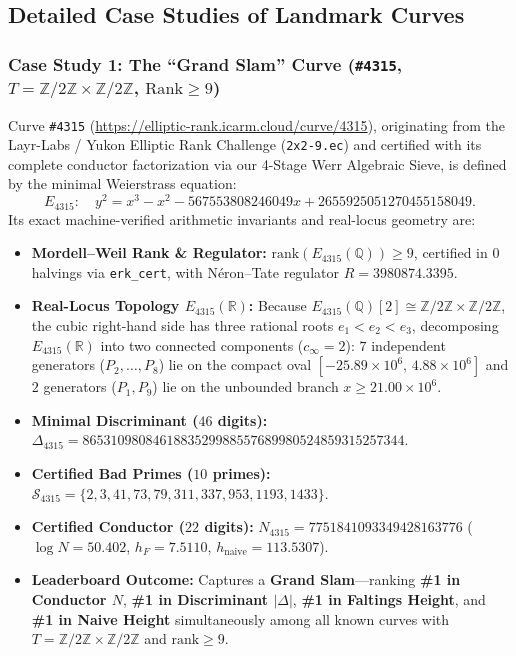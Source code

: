 \documentclass[10pt,a4paper]{article}
\theoremstyle{plain}
\theoremstyle{definition}
\theoremstyle{remark}
\begin{document}
\subsection{Detailed Case Studies of Landmark Curves}

\subsubsection{\texorpdfstring{Case Study 1: The ``Grand Slam'' Curve (\texttt{\#4315}, $T = \mathbb{Z}/2\mathbb{Z} \times \mathbb{Z}/2\mathbb{Z}$, $\mathrm{Rank} \ge 9$)}{Case Study 1: The Grand Slam Curve (\#4315, T = Z/2Z x Z/2Z, Rank >= 9)}}

Curve \texttt{\#4315} (\url{https://elliptic-rank.icarm.cloud/curve/4315}), originating from the Layr-Labs / Yukon Elliptic Rank Challenge (\texttt{2x2-9.ec}) and certified with its complete conductor factorization via our 4-Stage Werr Algebraic Sieve, is defined by the minimal Weierstrass equation:
\begin{equation}
E_{4315}: \quad y^2 = x^3 - x^2 - 567553808246049 x + 2655925051270455158049.
\end{equation}
Its exact machine-verified arithmetic invariants and real-locus geometry are:
\begin{itemize}[leftmargin=2em,noitemsep]
    \item \textbf{Mordell--Weil Rank \& Regulator:} $\mathrm{rank}(E_{4315}(\mathbb{Q})) \ge 9$, certified in $0$ halvings via \texttt{erk\_cert}, with N\'{e}ron--Tate regulator $R = 3980874.3395$.
    \item \textbf{Real-Locus Topology $E_{4315}(\mathbb{R})$:} Because $E_{4315}(\mathbb{Q})[2] \cong \mathbb{Z}/2\mathbb{Z} \times \mathbb{Z}/2\mathbb{Z}$, the cubic right-hand side has three rational roots $e_1 < e_2 < e_3$, decomposing $E_{4315}(\mathbb{R})$ into two connected components ($c_\infty = 2$): $7$ independent generators ($P_2, \dots, P_8$) lie on the compact oval $[-25.89 \times 10^6,\, 4.88 \times 10^6]$ and $2$ generators ($P_1, P_9$) lie on the unbounded branch $x \ge 21.00 \times 10^6$.
    \item \textbf{Minimal Discriminant ($46$ digits):} $\Delta_{4315} = 8653109808461883529988557689980524859315257344$.
    \item \textbf{Certified Bad Primes ($10$ primes):} $\mathcal{S}_{4315} = \{2, 3, 41, 73, 79, 311, 337, 953, 1193, 1433\}$.
    \item \textbf{Certified Conductor ($22$ digits):} $N_{4315} = 7751841093349428163776$ ($\log N = 50.402$, $h_F = 7.5110$, $h_{\text{naive}} = 113.5307$).
    \item \textbf{Leaderboard Outcome:} Captures a \textbf{Grand Slam}---ranking \textbf{\#1 in Conductor $N$}, \textbf{\#1 in Discriminant $|\Delta|$}, \textbf{\#1 in Faltings Height}, and \textbf{\#1 in Naive Height} simultaneously among all known curves with $T = \mathbb{Z}/2\mathbb{Z} \times \mathbb{Z}/2\mathbb{Z}$ and $\mathrm{rank} \ge 9$.
\end{itemize}
\end{document}
